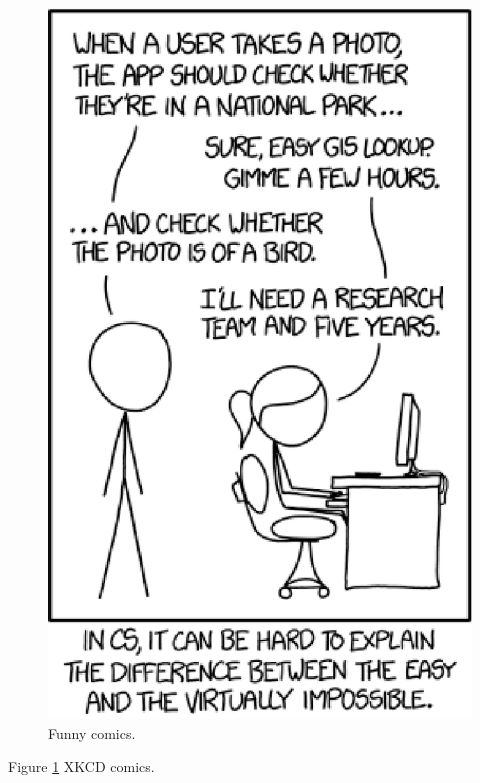 \documentclass{article}
\begin{document}
  \begin{figure}
    \includegraphics[width=\linewidth]{tasks.eps}
    \caption{Funny comics.}
    \label{fig:tasks1}
  \end{figure}

  Figure \ref{fig:tasks1} XKCD comics.
\end{document}
